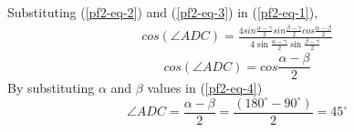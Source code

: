 \documentclass[journal,10pt,twocolumn]{article}
\begin{document}
Substituting (\ref{pf2-eq-2}) and (\ref{pf2-eq-3}) in (\ref{pf2-eq-1}),
\begin{multline*}
	cos(\angle ADC) = \frac{4sin\frac{\alpha-\gamma}{2}sin\frac{\beta-\gamma}{2}cos\frac{\alpha-\beta}{2}}{4 \sin\frac{\alpha-\gamma}2\sin\frac{\beta-\gamma}2}
\end{multline*}
\begin{equation}
cos(\angle ADC) = cos\frac{\alpha-\beta}{2}
\label{pf2-eq-4}
\end{equation}
\vspace*{5mm}
By substituting $\alpha$ and $\beta$ values in (\ref{pf2-eq-4})
\begin{equation*}
\angle ADC = \frac{\alpha-\beta}{2}=\frac{(180^\circ - 90^\circ )}{2}=45^\circ
\end{equation*}
















 
\end{document}
